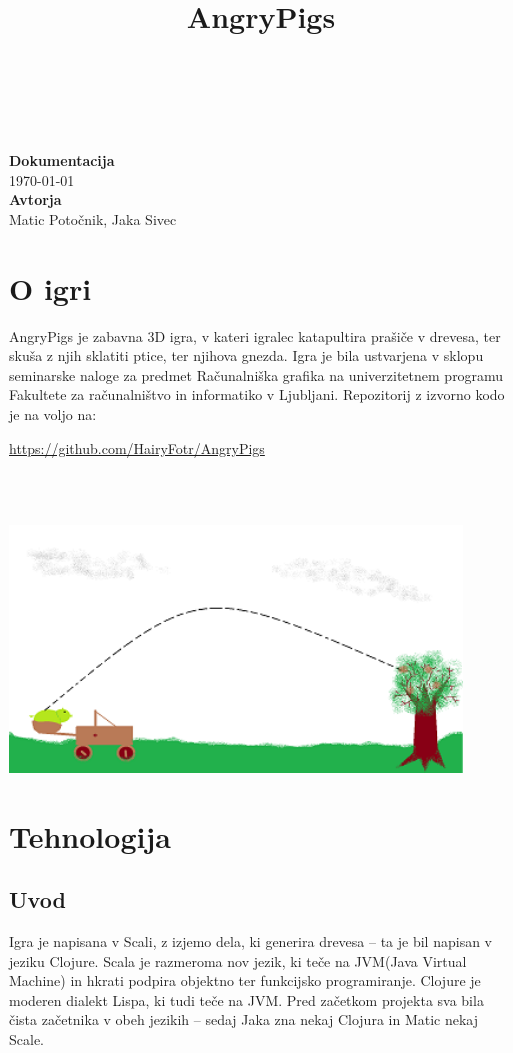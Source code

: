 \documentclass[10pt,a4paper,oneside]{book}
\title{AngryPigs}
\newcommand\inline[1]{%
\begin{Sbox}{#1}\end{Sbox}%
\colorbox{lightgray}{\TheSbox}%
}
\newcommand\br{%
 \ \\ \ \\%
}
\def\pa{\\[-6pt]}
\begin{document}
\begin{titlepage}
\begin{center}
\ \\[3.5cm]
{}\\[-2.8cm]
{}\\[3.9cm]
{\Huge\bf Dokumentacija}\\[0.35cm]
{\huge\today}\ \\[4.5cm]
{\Huge {\bf Avtorja}}\\[0.35cm]
{\huge Matic Potočnik, Jaka Sivec}
\vfill
\end{center}
\end{titlepage}
\chapter{O igri}
AngryPigs je zabavna 3D igra, v kateri igralec katapultira prašiče v drevesa, ter skuša z njih sklatiti ptice, ter njihova gnezda. Igra je bila ustvarjena v sklopu seminarske naloge za predmet Računalniška grafika na univerzitetnem programu Fakultete za računalništvo in informatiko v Ljubljani. Repozitorij z izvorno kodo je na voljo na: \inline{\url{https://github.com/HairyFotr/AngryPigs}}
\br
\begin{center}
\includegraphics[width=12cm]{conceptsmall}
\end{center}

\chapter{Tehnologija}
\section{Uvod}
Igra je napisana v Scali, z izjemo dela, ki generira drevesa -- ta je bil napisan v jeziku Clojure. Scala je razmeroma nov jezik, ki teče na JVM(Java Virtual Machine) in hkrati podpira objektno ter funkcijsko programiranje. Clojure je moderen dialekt Lispa, ki tudi teče na JVM. Pred začetkom projekta sva bila čista začetnika v obeh jezikih -- sedaj Jaka zna nekaj Clojura in Matic nekaj Scale.\pa
\end{document}

